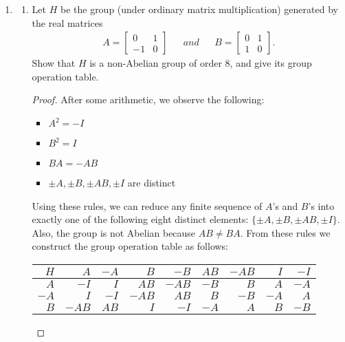 \documentclass{article}
\begin{document}
\begin{enumerate}
  \item \label{part_4}
    \begin{enumerate}
      \item Let $H$ be the group (under ordinary matrix multiplication)
        generated by the real matrices \label{part_a}
        \begin{align*}
          A =
            \begin{bmatrix}
              0   & 1 \\
              -1  & 0
            \end{bmatrix}
            && and &&
          B =
            \begin{bmatrix}
              0   & 1 \\
              1   & 0
            \end{bmatrix}.
        \end{align*}
        Show that $H$ is a non-Abelian group of order 8, and give its group
        operation table.
        \begin{proof}
          After some arithmetic, we observe the following:
          \begin{itemize}
            \item $A^2=-I$
            \item $B^2=I$
            \item $BA=-AB$
            \item $\pm A, \pm B, \pm AB, \pm I$ are distinct 
          \end{itemize}
          Using these rules, we can reduce any finite sequence of $A$'s and
          $B$'s into exactly one of the following eight distinct elements:
          $\{\pm A, \pm B, \pm AB, \pm I\}$. Also, the group is not Abelian
          because $AB\neq BA$. From these rules we construct the group
          operation table as follows: \\
          \begin{center}
            \begin{tabular}{|r||r|r|r|r|r|r|r|r|}
              \hline
              $H$       & $A$   & $-A$  & $B$   & $-B$  & $AB$  & $-AB$ & $I$   & $-I$ \\
              \hline\hline
              $A$       & $-I$  & $I$   & $AB$  & $-AB$ & $-B$  & $B$   & $A$   & $-A$ \\
              \hline
              $-A$      & $I$   & $-I$  & $-AB$ & $AB$  & $B$   & $-B$  & $-A$  & $A$ \\
              \hline
              $B$       & $-AB$ & $AB$  & $I$   & $-I$  & $-A$  & $A$   & $B$   & $-B$ \\

\end{tabular}
\end{center}
\end{proof}
\end{enumerate}
\end{enumerate}
\end{document}
